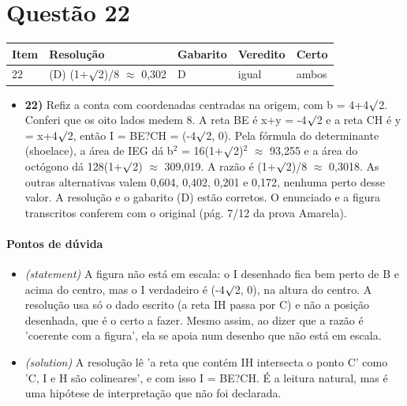 \documentclass{article}%
\begin{document}
\section*{Questão 22}%
\begin{longtable}{@{}p{} p{} p{} p{} p{}@{}}\toprule Item & Resolução & Gabarito & Veredito & Certo \\ \midrule
22 & (D) (1+$\surd$2)/8 $\approx$ 0,302 & D & igual & ambos \\
\bottomrule\end{longtable}%
\begin{itemize}%
\item%
\textbf{22)} Refiz a conta com coordenadas centradas na origem, com b = 4+4$\surd$2. Conferi que os oito lados medem 8. A reta BE é x+y = -4$\surd$2 e a reta CH é y = x+4$\surd$2, então I = BE?CH = (-4$\surd$2, 0). Pela fórmula do determinante (shoelace), a área de IEG dá b$^2$ = 16(1+$\surd$2)$^2$ $\approx$ 93,255 e a área do octógono dá 128(1+$\surd$2) $\approx$ 309,019. A razão é (1+$\surd$2)/8 $\approx$ 0,3018. As outras alternativas valem 0,604, 0,402, 0,201 e 0,172, nenhuma perto desse valor. A resolução e o gabarito (D) estão corretos. O enunciado e a figura transcritos conferem com o original (pág. 7/12 da prova Amarela).%
\end{itemize}%
\paragraph{Pontos de dúvida}%
\begin{itemize}%
\item%
\textit{(statement)} A figura não está em escala: o I desenhado fica bem perto de B e acima do centro, mas o I verdadeiro é (-4$\surd$2, 0), na altura do centro. A resolução usa só o dado escrito (a reta IH passa por C) e não a posição desenhada, que é o certo a fazer. Mesmo assim, ao dizer que a razão é 'coerente com a figura', ela se apoia num desenho que não está em escala.%
\item%
\textit{(solution)} A resolução lê 'a reta que contém IH intersecta o ponto C' como 'C, I e H são colineares', e com isso I = BE?CH. É a leitura natural, mas é uma hipótese de interpretação que não foi declarada.%
\end{itemize}%
\end{document}
